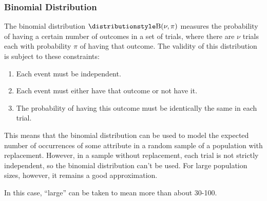 \subsubsection{Binomial Distribution}


The binomial distribution \(\Binomial(\nu, \pi)\) measures the probability
of having a certain number of outcomes in a set of trials,  where there are
\(\nu\) trials each with probability \(\pi\) of having that outcome.
The validity of this distribution is subject to these constraints:
\begin{enumerate}
\item Each event must be independent.
\item Each event must either have that outcome or not have it.
\item The probability of having this outcome must be identically the same in
      each trial.
\end{enumerate}
This means that the binomial distribution can be used to model the expected
number of occurrences of some attribute in a random sample of a population
with replacement. However, in a sample without replacement, each trial is
not strictly independent, so the binomial distribution can't be used. For
large population sizes, however, it remains a good approximation.

In this case, ``large'' can be taken to mean more than about 30-100.

